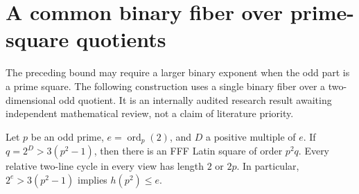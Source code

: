 \section{A common binary fiber over prime-square quotients}
\label{sec:prime-square-norm-lift}

The preceding bound may require a larger binary exponent when the odd
part is a prime square.  The following construction uses a single binary
fiber over a two-dimensional odd quotient.  It is an internally audited
research result awaiting independent mathematical review, not a claim of
literature priority.

\begin{theorem}
\label{thm:quadratic-norm-lift}
Let $p$ be an odd prime, $e=\operatorname{ord}_p(2)$, and $D$ a positive
multiple of $e$.  If $q=2^D>3(p^2-1)$, then there is an FFF Latin square
of order $p^2q$.  Every relative two-line cycle in every view has length
$2$ or $2p$.  In particular, $2^e>3(p^2-1)$ implies $h(p^2)\leq e$.
\end{theorem}

